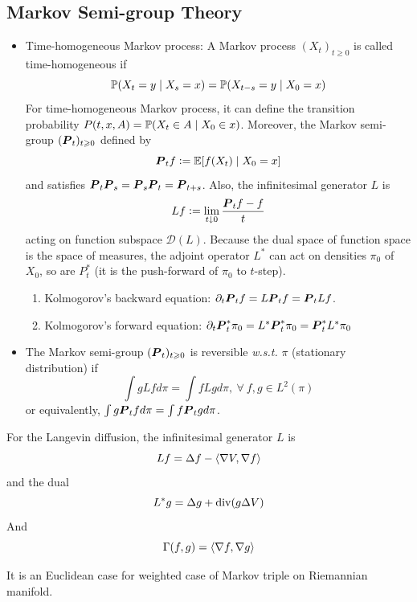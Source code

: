 \documentclass[a4paper,12pt]{article}
\begin{document}
\subsection{Markov Semi-group Theory}
\begin{itemize}
  \item Time-homogeneous Markov process: A Markov process $(X_t)_{t \geqslant 0}$ is called time-homogeneous if 
  \begin{equation*}
    \mathbb{P}(X_t = y \mid X_s = x) = \mathbb{P}(X_{t-s} = y \mid X_0 = x)
  \end{equation*}
  For time-homogeneous Markov process, it can define the transition probability $P(t,x,A) = \mathbb{P}(X_t \in A \mid X_0 \in x)$. Moreover, the Markov semi-group $(\boldsymbol{P}_t)_{t \geqslant 0}$ defined by
  \begin{equation*}
    \boldsymbol{P}_tf \vcentcolon= \mathbb{E}[f(X_t) \mid X_0=x]
  \end{equation*}
  and satisfies $\boldsymbol{P}_t\boldsymbol{P}_s=\boldsymbol{P}_s\boldsymbol{P}_t=\boldsymbol{P}_{t+s}$. Also, the infinitesimal generator $L$ is
  \begin{equation*}
    Lf \vcentcolon= \lim_{t \downarrow 0}\frac{\boldsymbol{P}_tf - f}{t}
  \end{equation*}
  acting on function subspace $\mathcal{D}(L)$. Because the dual space of function space is the space of measures, the adjoint operator $L^*$ can act on densities $\pi_0$ of $X_0$, so are $P_t^*$ (it is the push-forward of $\pi_0$ to $t$-step).
  \begin{enumerate}[label=\Roman{*}.]
    \item Kolmogorov’s backward equation: $\partial_t \boldsymbol{P}_tf = L\boldsymbol{P}_tf = \boldsymbol{P}_tLf$.
    \item Kolmogorov’s forward equation: $\partial_t \boldsymbol{P}_t^*\pi_0 = L^*\boldsymbol{P}_t^*\pi_0 = \boldsymbol{P}_t^*L^*\pi_0$
  \end{enumerate}

  \item The Markov semi-group $(\boldsymbol{P}_t)_{t \geqslant 0}$ is reversible \emph{w.s.t.} $\pi$ (stationary distribution) if
  \begin{equation*}
    \int gLf d\pi = \int fLg d\pi,~\forall~f,g \in L^2(\pi)
  \end{equation*}
  or equivalently, $\int g\boldsymbol{P}_tf d\pi = \int f\boldsymbol{P}_tg d\pi$.
\end{itemize}

\begin{exam}
  For the Langevin diffusion, the infinitesimal generator $L$ is
  \begin{equation*}
    Lf = \Delta f - \left\langle \nabla V, \nabla f \right\rangle
  \end{equation*}
  and the dual
  \begin{equation*}
    L^*g = \Delta g + \operatorname{div}(g\Delta V)
  \end{equation*}
  And
  \begin{equation*}
    \Gamma(f,g) = \left\langle \nabla f,\nabla g \right\rangle
  \end{equation*}
\end{exam}
\begin{rmk}
  It is an Euclidean case for weighted case of Markov triple on Riemannian manifold.
\end{rmk}
\end{document}
